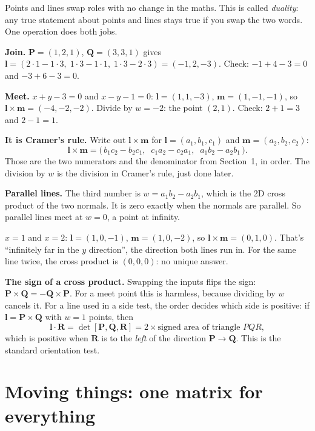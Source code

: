 \documentclass[11pt,a4paper]{article}
\newcommand{\vect}[1]{\mathbf{#1}}
\newcommand{\vP}{\vect{P}}
\newcommand{\vQ}{\vect{Q}}
\newcommand{\vl}{\vect{l}}
\newcommand{\vm}{\vect{m}}
\begin{document}
\begin{plainbox}
Points and lines swap roles with no change in the maths. This is called \emph{duality}: any true statement about points and
lines stays true if you swap the two words. One operation does both jobs.
\end{plainbox}

\begin{examplebox}
\textbf{Join.} $\vP=(1,2,1)$, $\vQ=(3,3,1)$ gives $\vl=(2\cdot1-1\cdot3,\;1\cdot3-1\cdot1,\;1\cdot3-2\cdot3)=(-1,2,-3)$.
Check: $-1+4-3=0$ and $-3+6-3=0$.

\textbf{Meet.} $x+y-3=0$ and $x-y-1=0$: $\vl=(1,1,-3)$, $\vm=(1,-1,-1)$, so $\vl\times\vm=(-4,-2,-2)$. Divide by $w=-2$:
the point $(2,1)$. Check: $2+1=3$ and $2-1=1$.
\end{examplebox}

\textbf{It is Cramer's rule.} Write out $\vl\times\vm$ for $\vl=(a_1,b_1,c_1)$ and $\vm=(a_2,b_2,c_2)$:
\[
\vl\times\vm=\big(\,b_1c_2-b_2c_1,\;\;c_1a_2-c_2a_1,\;\;a_1b_2-a_2b_1\,\big).
\]
Those are the two numerators and the denominator from Section~1, in order. The division by $w$ is the division in Cramer's
rule, just done later.

\textbf{Parallel lines.} The third number is $w=a_1b_2-a_2b_1$, which is the 2D cross product of the two normals. It is zero
exactly when the normals are parallel. So parallel lines meet at $w=0$, a point at infinity.
\begin{examplebox}
$x=1$ and $x=2$: $\vl=(1,0,-1)$, $\vm=(1,0,-2)$, so $\vl\times\vm=(0,1,0)$. That's ``infinitely far in the $y$ direction'',
the direction both lines run in. For the same line twice, the cross product is $(0,0,0)$: no unique answer.
\end{examplebox}

\textbf{The sign of a cross product.} Swapping the inputs flips the sign: $\vP\times\vQ=-\vQ\times\vP$. For a meet point this
is harmless, because dividing by $w$ cancels it. For a line used in a side test, the order decides which side is positive: if
$\vl=\vP\times\vQ$ with $w=1$ points, then
\[
\vl\cdot\vect{R}=\det[\vP,\vQ,\vect{R}]=2\times\text{signed area of triangle }PQR ,
\]
which is positive when $\vect{R}$ is to the \emph{left} of the direction $\vP\to\vQ$. This is the standard orientation test.

\section{Moving things: one matrix for everything}
\end{document}
